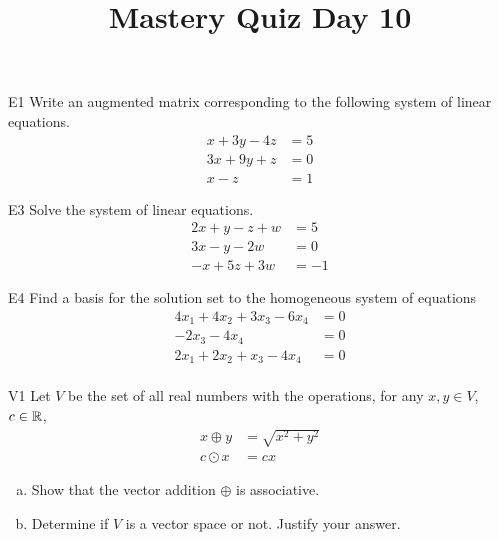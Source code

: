 \documentclass{sbgLAquiz}
\title{Mastery Quiz Day 10 }
\begin{document}
\begin{problem}{E1}
Write an augmented matrix corresponding to the following system of linear equations.
\begin{align*}
x+3y-4z &= 5 \\
3x+9y+z &= 0 \\
x-z &= 1
\end{align*}
\end{problem}

\begin{problem}{E3}
Solve the system of linear equations.
\begin{align*}
2x+y-z+w &=5 \\
3x-y-2w &= 0 \\
-x+5z+3w&=-1
\end{align*}
\end{problem}
\newpage

\begin{problem}{E4}
Find a basis for the solution set to the homogeneous system of equations
\begin{align*}
4x_1+4x_2+3x_3-6x_4 &= 0 \\
-2x_3-4x_4 &= 0 \\
2x_1+2x_2+x_3-4x_4 &= 0 \\
\end{align*}
\end{problem}

\begin{problem}{V1}
Let $V$ be the set of all real numbers with the operations, for any $x, y \in V$, $c \in \mathbb{R}$,
\begin{align*}
x \oplus y &= \sqrt{x^2+y^2} \\
c \odot x &= c x
\end{align*}
\begin{enumerate}[(a)]
\item Show that the vector addition $\oplus$ is associative.
\item Determine if $V$ is a vector space or not.  Justify your answer.
\end{enumerate}
\end{problem}
\end{document}
